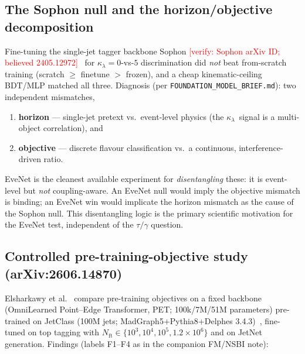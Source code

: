 \documentclass[11pt]{article}
\newcommand{\kl}{\ensuremath{\kappa_\lambda}}
\newcommand{\Nft}{\ensuremath{N_{\mathrm{ft}}}}
\newcommand{\toverify}[1]{\textcolor{red}{[verify: #1]}}
\begin{document}
\subsection{The Sophon null and the horizon/objective decomposition}
\label{sec:sophon}

Fine-tuning the single-jet tagger backbone Sophon
\toverify{Sophon arXiv ID; believed 2405.12972}~\cite{Li:2024sophon} for
$\kl=0$-vs-$5$ discrimination did \emph{not} beat from-scratch training
(scratch $\geq$ finetune $>$ frozen), and a cheap kinematic-ceiling
BDT/MLP matched all three. Diagnosis (per
\texttt{FOUNDATION\_MODEL\_BRIEF.md}): two independent mismatches,
\begin{enumerate}[label=(\roman*)]
\item \textbf{horizon} --- single-jet pretext vs.\ event-level physics
  (the \kl\ signal is a multi-object correlation), and
\item \textbf{objective} --- discrete flavour classification vs.\ a
  continuous, interference-driven ratio.
\end{enumerate}
EveNet is the cleanest available experiment for \emph{disentangling} these:
it is event-level but \emph{not} coupling-aware. An EveNet null would imply
the objective mismatch is binding; an EveNet win would implicate the horizon
mismatch as the cause of the Sophon null. This disentangling logic is the
primary scientific motivation for the EveNet test, independent of the
$\tau/\gamma$ question.

\subsection{Controlled pre-training-objective study (arXiv:2606.14870)}
\label{sec:elsharkawy}

Elsharkawy et al.~\cite{Elsharkawy:2026} compare pre-training objectives on a
fixed backbone (OmniLearned Point--Edge Transformer, PET; 100k/7M/51M
parameters) pre-trained on JetClass (100M jets; MadGraph5+Pythia8+Delphes
3.4.3)~\cite{Qu:2022part}, fine-tuned on top tagging with
$\Nft\in\{10^3,10^4,10^5,1.2\times10^6\}$ and on JetNet generation. Findings
(labels F1--F4 as in the companion FM/NSBI note):
\end{document}
